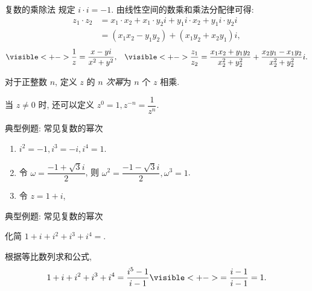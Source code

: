 \begin{frame}{复数的乘除法}
\onslide<+->\alert{规定 $i\cdot i=-1$.}
\onslide<+->由线性空间的数乘和乘法分配律可得:
\onslide<+->
\begin{align*}
z_1\cdot z_2&=x_1\cdot x_2+x_1\cdot y_2i+y_1i\cdot x_2+y_1i\cdot y_2i\\
&=(x_1x_2-y_1y_2)+(x_1y_2+x_2y_1)i,
\end{align*}
\vspace{-\baselineskip}
\[\visible<+->{\frac1{z}=\frac{x-yi}{x^2+y^2},}\quad
\visible<+->{\frac{z_1}{z_2}=\frac{x_1x_2+y_1y_2}{x_2^2+y_2^2}+\frac{x_2y_1-x_1y_2}{x_2^2+y_2^2}i.}\]

\onslide<+->对于正整数 $n$, 定义 $z$ 的 \emph{$n$ 次幂}为 $n$ 个 $z$ 相乘.

\onslide<+->当 $z\neq 0$ 时, 还可以定义 $z^0=1,z^{-n}=\dfrac1{z^n}$.
\end{frame}


\begin{frame}{典型例题: 常见复数的幂次}
\onslide<+->
\begin{example}
\begin{enumerate}
\item $i^2=-1,i^3=-i,i^4=1$.
%
\item 令 $\omega=\dfrac{-1+\sqrt 3i}2$, 则 $\omega^2=\dfrac{-1-\sqrt3i}2,\omega^3=1$.
\item 令 $z=1+i$, 
\vspace{-\baselineskip}
\end{enumerate}
\end{example}
\end{frame}


\begin{frame}{典型例题: 常见复数的幂次}
\onslide<+->
\begin{example}
化简 $1+i+i^2+i^3+i^4=$.
\end{example}
\onslide<+->
\begin{solution}
根据等比数列求和公式,
\[1+i+i^2+i^3+i^4=\frac{i^5-1}{i-1}
\visible<+->{=\frac{i-1}{i-1}=1.}\]
\vspace{-\baselineskip}
\end{solution}
\end{frame}


